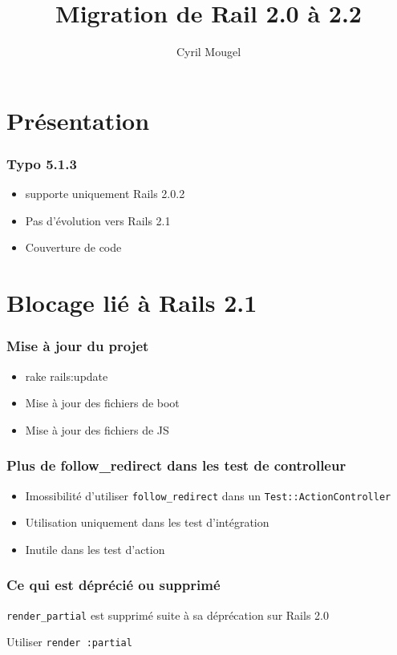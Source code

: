 \documentclass{beamer}
\title{Migration de Rail 2.0 à 2.2}
\author{Cyril Mougel}
\begin{document}
\begin{frame}
    \titlepage
\end{frame}

\section{Pr\'esentation}

\begin{frame}
	\frametitle{Typo 5.1.3}
	\begin{itemize}
		\item supporte uniquement Rails 2.0.2
		\item Pas d'évolution vers Rails 2.1
		\item Couverture de code
	\end{itemize}
\end{frame}

\section{Blocage lié à Rails 2.1}

\begin{frame}
    \frametitle{Mise à jour du projet}
    \begin{itemize}
        \item rake rails:update
        \item Mise à jour des fichiers de boot
        \item Mise à jour des fichiers de JS
    \end{itemize}
\end{frame}

\begin{frame}
    \frametitle{Plus de follow\_redirect dans les test de controlleur}
    \begin{itemize}
        \item Imossibilité d'utiliser \lstinline!follow_redirect! dans un
        \lstinline!Test::ActionController!
        \item Utilisation uniquement dans les test d'intégration
        \item Inutile dans les test d'action
    \end{itemize}
\end{frame}

\begin{frame}
    \frametitle{Ce qui est déprécié ou supprimé}
    \lstinline!render_partial! est supprimé suite à sa déprécation sur Rails
        2.0
        
    Utiliser \lstinline!render :partial!
\end{frame}
\end{document}
